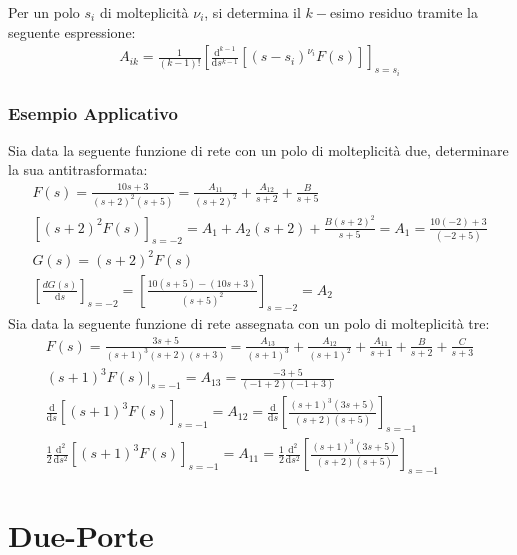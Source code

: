 \documentclass{article}
\newcommand{\df}{\mathrm{d}}
\numberwithin{equation}{subsection}
\begin{document}
Per un polo $s_i$ di molteplicità $\nu_i$, si determina il $k-$esimo residuo tramite la seguente espressione:
\begin{gather*}
    A_{ik}=\displaystyle\frac{1}{(k-1)!}\left[\frac{\df^{k-1}}{\df s^{k-1}}\left[(s-s_i)^{\nu_i}F(s)\right]\right]_{s=s_i}
\end{gather*}

\subsubsection{Esempio Applicativo}

Sia data la seguente funzione di rete con un polo di molteplicità due, determinare la sua antitrasformata: 
\begin{gather*}
    F(s)=\displaystyle\frac{10s+3}{(s+2)^2(s+5)}=\frac{A_{11}}{(s+2)^2}+\frac{A_{12}}{s+2}+\frac{B}{s+5}\\
    \left[(s+2)^2F(s)\right]_{s=-2}=A_1+A_2(s+2)+\displaystyle\frac{B(s+2)^2}{s+5}=A_1=\frac{10(-2)+3}{(-2+5)}\\
    G(s)=(s+2)^2F(s)\\
    \displaystyle\left[\frac{dG(s)}{\df s}\right]_{s=-2}=\left[\frac{10(s+5)-(10s+3)}{(s+5)^2}\right]_{s=-2}=A_2
\end{gather*}
Sia data la seguente funzione di rete assegnata con un polo di molteplicità tre:
\begin{gather*}
    F(s)=\displaystyle\frac{3s+5}{(s+1)^3(s+2)(s+3)}=\frac{A_{13}}{(s+1)^3}+\frac{A_{12}}{(s+1)^2}+\frac{A_{11}}{s+1}+\frac{B}{s+2}+\frac{C}{s+3}\\
    (s+1)^3F(s)\bigg|_{s=-1}=A_{13}=\displaystyle\frac{-3+5}{(-1+2)(-1+3)}\\
    \displaystyle\frac{\df}{\df s}\left[(s+1)^3F(s)\right]_{s=-1}=A_{12}=\frac{\df}{\df s}\left[\frac{(s+1)^3(3s+5)}{(s+2)(s+5)}\right]_{s=-1}\\
    \frac{1}{2}\displaystyle\frac{\df^2}{\df s^2}\left[(s+1)^3F(s)\right]_{s=-1}=A_{11}=\frac{1}{2}\frac{\df^2}{\df s^2}\left[\frac{(s+1)^3(3s+5)}{(s+2)(s+5)}\right]_{s=-1}
\end{gather*}

\clearpage

\section{Due-Porte}
\end{document}
